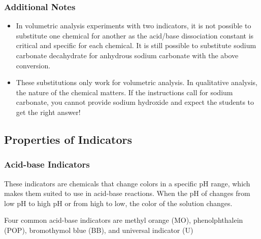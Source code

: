 \subsubsection{Additional Notes}

\begin{itemize}

\item{In volumetric analysis experiments with two indicators, it is not possible to substitute one chemical for another as the acid/base dissociation constant is critical and specific for each chemical. It is still possible to substitute sodium carbonate decahydrate for anhydrous sodium carbonate with the above conversion.}

\item{These substitutions only work for volumetric analysis. In qualitative analysis, the nature of the chemical matters. If the instructions call for sodium carbonate, you cannot provide sodium hydroxide and expect the students to get the right answer!}

\end{itemize}

\subsection{Properties of Indicators}

\subsubsection{Acid-base Indicators}
These indicators are chemicals that change colors in a specific pH range, which makes them suited to use in acid-base reactions. When the pH of changes from low pH to high pH or from high to low, the color of the solution changes. 

Four common acid-base indicators are methyl orange (MO), phenolphthalein (POP), bromothymol blue (BB), and universal indicator (U)

